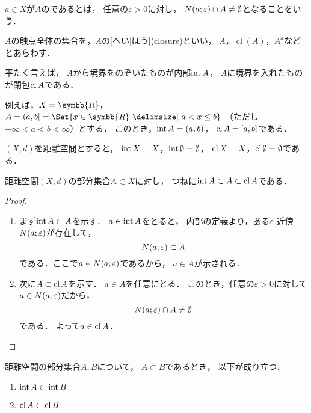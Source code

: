 \documentclass[../sotsu.tex]{subfiles}
\begin{document}
\begin{definition}
    \label{dfn:closure}
    $a \in X$が$A$のであるとは，
    任意の$\varepsilon > 0$に対し，
    $N(a; \varepsilon) \cap A \neq \emptyset$となることをいう．

    $A$の触点全体の集合を，$A$の[へい|ほう](closure)といい，
    $\bar{A}$，$\operatorname{cl}(A)$，$A^a$などとあらわす．
\end{definition}

平たく言えば，
$A$から境界をのぞいたものが内部$\operatorname{int}{A}$，
$A$に境界を入れたものが閉包$\operatorname{cl}{A}$である．

例えば，$X = \symbb{R}$，
$A = (a, b] = \Set{ x \in \symbb{R} \given a < x \leq b }$
（ただし$-\infty < a < b < \infty$）とする．
このとき，$\operatorname{int}{A} = (a, b)$，
$\operatorname{cl}{A} = [a, b]$である．


\begin{example}
    \label{thm:interior-and-closure-of-emptyset}
    $(X, d)$を距離空間とすると，
    $\operatorname{int}{X} = X$，$\operatorname{int}{\emptyset} = \emptyset$，
    $\operatorname{cl}{X} = X$，$\operatorname{cl}{\emptyset} = \emptyset$である．
\end{example}


\begin{proposition}
    \label{thm:interior-closure-inclusion}
    距離空間$(X, d)$の部分集合$A \subset X$に対し，
    つねに$\operatorname{int}{A} \subset A \subset \operatorname{cl}{A}$である．
\end{proposition}

\begin{proof}
    \begin{enumerate}
        \item まず$\operatorname{int}{A} \subset A$を示す．
            $a \in \operatorname{int}{A}$をとると，
            内部の定義より，ある$\varepsilon$-近傍$N(a; \varepsilon)$が存在して，
            \[  N(a; \varepsilon) \subset A  \]
            である．ここで$a \in N(a; \varepsilon)$であるから，
            $a \in A$が示される．
        \item 次に$A \subset \operatorname{cl}{A}$を示す．
            $a \in A$を任意にとる．
            このとき，任意の$\varepsilon > 0$に対して$a \in N(a; \varepsilon)$だから，
            \[ N(a; \varepsilon) \cap A \neq \emptyset \]
            である．
            よって$a \in \operatorname{cl}{A}$．\qedhere
    \end{enumerate}
\end{proof}


\begin{proposition}
    \label{thm:inclusion-for-int-and-cl}
    距離空間の部分集合$A, B$について，
    $A \subset B$であるとき，
    以下が成り立つ．
    \begin{enumerate}
        \item $\operatorname{int}{A} \subset \operatorname{int}{B}$
        \item $\operatorname{cl}{A} \subset \operatorname{cl}{B}$
    \end{enumerate}
\end{proposition}
\end{document}
